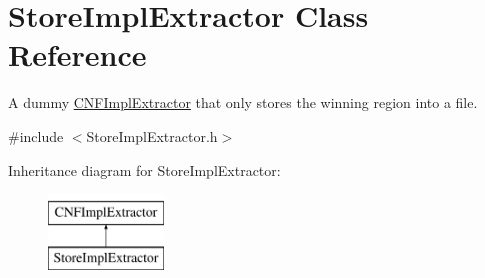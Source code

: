 \hypertarget{classStoreImplExtractor}{\section{Store\-Impl\-Extractor Class Reference}
\label{classStoreImplExtractor}
}


A dummy \hyperlink{classCNFImplExtractor}{C\-N\-F\-Impl\-Extractor} that only stores the winning region into a file.  




{\ttfamily \#include $<$Store\-Impl\-Extractor.\-h$>$}

Inheritance diagram for Store\-Impl\-Extractor\-:\begin{figure}[H]
\begin{center}
\leavevmode
\includegraphics[height=2.000000cm]{classStoreImplExtractor}
\end{center}
\end{figure}
